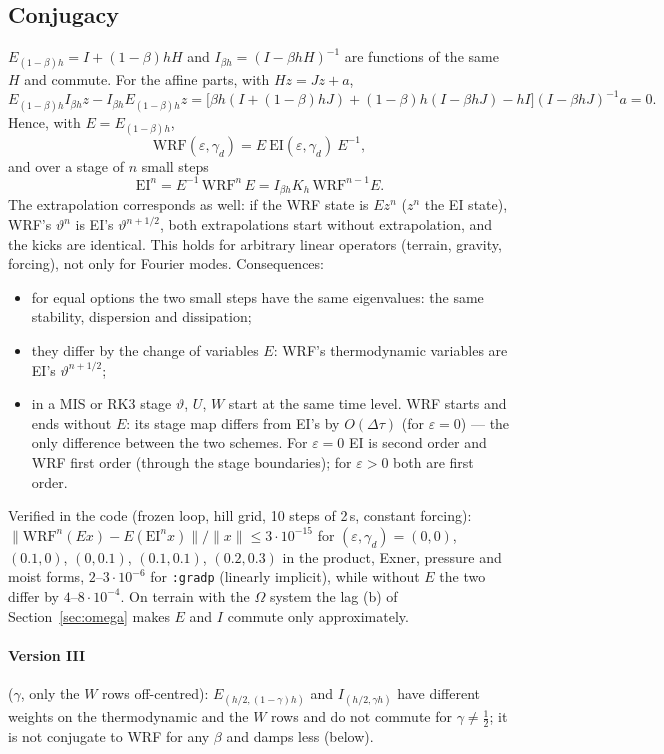 \documentclass[11pt,a4paper]{article}
\newcommand{\dtau}{\Delta\tau}
\newcommand{\code}[1]{\texttt{\small #1}}
\newcommand{\tv}{\vartheta}   %
\begin{document}
\subsection{Conjugacy}\label{sec:opt}
$E_{(1-\beta)h}=I+(1-\beta)hH$ and $I_{\beta h}=(I-\beta hH)^{-1}$ are functions of the same $H$ and commute. For the affine
parts, with $Hz=Jz+a$,
\[
E_{(1-\beta)h}I_{\beta h}z-I_{\beta h}E_{(1-\beta)h}z=\big[\beta h(I+(1-\beta)hJ)+(1-\beta)h(I-\beta hJ)-hI\big](I-\beta hJ)^{-1}a=0 .
\]
Hence, with $E=E_{(1-\beta)h}$,
\[
\text{WRF}(\varepsilon,\gamma_d)=E\ \text{EI}(\varepsilon,\gamma_d)\ E^{-1},
\]
and over a stage of $n$ small steps
\[
\text{EI}^n=E^{-1}\,\text{WRF}^n\,E=I_{\beta h}K_h\,\text{WRF}^{n-1}E .
\]
The extrapolation corresponds as well: if the WRF state is $Ez^n$ ($z^n$ the EI state), WRF's $\tv^n$ is EI's $\tv^{n+1/2}$,
both extrapolations start without extrapolation, and the kicks are identical. This holds for arbitrary
linear operators (terrain, gravity, forcing), not only for Fourier modes. Consequences:
\begin{itemize}
\item for equal options the two small steps have the same eigenvalues: the same stability, dispersion
and dissipation;
\item they differ by the change of variables $E$: WRF's thermodynamic variables are EI's $\tv^{n+1/2}$;
\item in a MIS or RK3 stage $\tv$, $U$, $W$ start at the same time level. WRF starts and ends without $E$: its
stage map differs from EI's by $O(\dtau)$ (for $\varepsilon=0$) --- the only difference between the two schemes.
For $\varepsilon=0$ EI is second order and WRF first order (through the stage boundaries); for $\varepsilon>0$ both are first
order.
\end{itemize}
Verified in the code (frozen loop, hill grid, 10 steps of 2\,s, constant forcing):
$\|\text{WRF}^n(Ex)-E(\text{EI}^nx)\|/\|x\|\le3\cdot10^{-15}$ for $(\varepsilon,\gamma_d)=(0,0)$, $(0.1,0)$, $(0,0.1)$, $(0.1,0.1)$, $(0.2,0.3)$ in the
product, Exner, pressure and moist forms, $2$--$3\cdot10^{-6}$ for \code{:gradp} (linearly implicit), while without $E$ the
two differ by $4$--$8\cdot10^{-4}$. On terrain with the $\Omega$ system the lag (b) of Section~\ref{sec:omega} makes $E$ and $I$
commute only approximately.

\paragraph{Version III} ($\gamma$, only the $W$ rows off-centred): $E_{(h/2,(1-\gamma)h)}$ and $I_{(h/2,\gamma h)}$ have different weights on
the thermodynamic and the $W$ rows and do not commute for $\gamma\ne\tfrac12$; it is not conjugate to WRF for any
$\beta$ and damps less (below).
\end{document}
